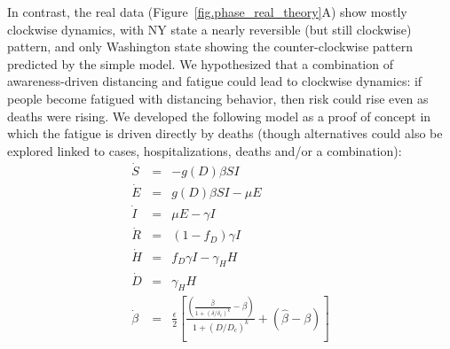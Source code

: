 In contrast, the real data (Figure~\ref{fig.phase_real_theory}A) show mostly clockwise dynamics, with NY state a nearly reversible (but still clockwise) pattern, and only Washington state showing the counter-clockwise pattern predicted by the simple model.
We hypothesized that
a combination of awareness-driven distancing and fatigue
could lead to clockwise dynamics: if people become fatigued with distancing behavior, then risk could rise even as deaths were rising.
We developed the following model as a proof of concept in which
the fatigue is driven directly by deaths (though alternatives
could also be explored linked to cases, hospitalizations, deaths 
and/or a combination):
\begin{eqnarray}
\dot{S} &=& -g(D) \beta SI\\
\dot{E} &=& g(D) \beta SI-\mu E\\
\dot{I} &=& \mu E-\gamma I \\
\dot{R} &=& (1-f_D)\gamma I\\
\dot{H} &=& f_D\gamma I - \gamma_H H\\
\dot{D} &=& \gamma_H H \\
\dot{\beta} &=&\frac{\epsilon}{2}\left[\frac{\left(\frac{\hat{\beta}}{1+\left(\delta/\delta_c\right)^{k}}-\beta\right)}{1+\left(D/D_c\right)^k}+\left(\hat{\beta}-\beta\right)\right] \label{eq.fatigue}
\end{eqnarray}


